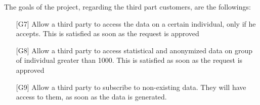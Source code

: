 The goals of the project, regarding the third part customers, are the followings:
\begin{enumerate}
\item[{[G7]}] Allow a third party to access the data on a certain individual, only if he accepts. This is satisfied as soon as the request is approved
\item[{[G8]}] Allow a third party to access statistical and anonymized data on group of individual greater than 1000. This is satisfied as soon as the request is approved
\item[{[G9]}] Allow a third party to subscribe to non-existing data. They will have access to them, as soon as the data is generated. 
\end{enumerate}